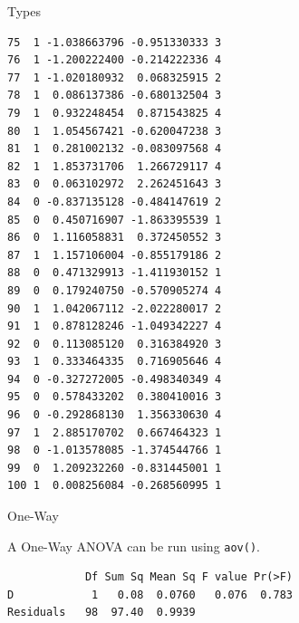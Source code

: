 \begin{frame}[fragile]{Types}
\begin{verbatim}
75  1 -1.038663796 -0.951330333 3
76  1 -1.200222400 -0.214222336 4
77  1 -1.020180932  0.068325915 2
78  1  0.086137386 -0.680132504 3
79  1  0.932248454  0.871543825 4
80  1  1.054567421 -0.620047238 3
81  1  0.281002132 -0.083097568 4
82  1  1.853731706  1.266729117 4
83  0  0.063102972  2.262451643 3
84  0 -0.837135128 -0.484147619 2
85  0  0.450716907 -1.863395539 1
86  0  1.116058831  0.372450552 3
87  1  1.157106004 -0.855179186 2
88  0  0.471329913 -1.411930152 1
89  0  0.179240750 -0.570905274 4
90  1  1.042067112 -2.022280017 2
91  1  0.878128246 -1.049342227 4
92  0  0.113085120  0.316384920 3
93  1  0.333464335  0.716905646 4
94  0 -0.327272005 -0.498340349 4
95  0  0.578433202  0.380410016 3
96  0 -0.292868130  1.356330630 4
97  1  2.885170702  0.667464323 1
98  0 -1.013578085 -1.374544766 1
99  0  1.209232260 -0.831445001 1
100 1  0.008256084 -0.268560995 1
\end{verbatim}

\end{frame}

\begin{frame}[fragile]{One-Way}

A One-Way ANOVA can be run using \texttt{aov()}.

\begin{Shaded}
\begin{Highlighting}[]
\StringTok{ }\OperatorTok{~}\StringTok{ }
\end{Highlighting}
\end{Shaded}

\begin{verbatim}
            Df Sum Sq Mean Sq F value Pr(>F)
D            1   0.08  0.0760   0.076  0.783
Residuals   98  97.40  0.9939               
\end{verbatim}

\end{frame}

